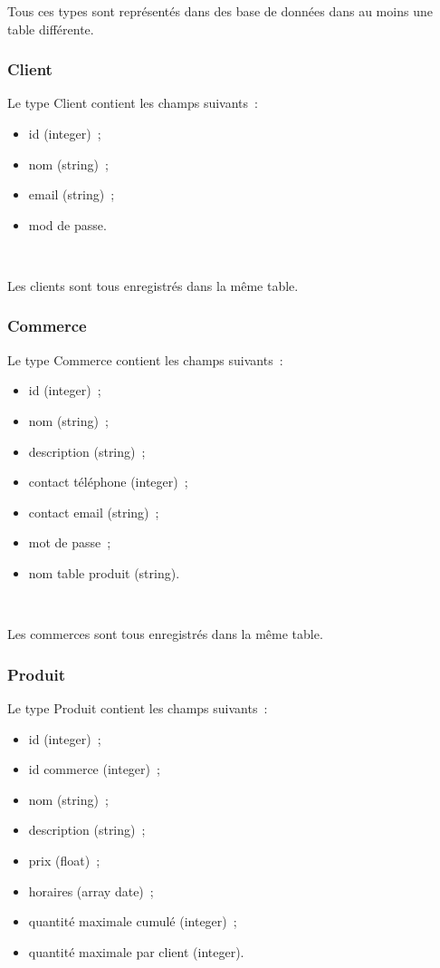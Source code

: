 \documentclass[a4paper,12pt]{article}
\begin{document}
Tous ces types sont représentés dans des base de données dans au moins une table différente.

\subsubsection{Client}

Le type Client contient les champs suivants~:
\begin{itemize}
	\item id (integer)~;
	\item nom (string)~;
	\item email (string)~;
	\item mod de passe.
\end{itemize} \

Les clients sont tous enregistrés dans la même table.

\subsubsection{Commerce}

Le type Commerce contient les champs suivants~:
\begin{itemize}
	\item id (integer)~;
	\item nom (string)~;
	\item description (string)~;
	\item contact téléphone (integer)~;
	\item contact email (string)~;
	\item mot de passe~;
	\item nom table produit (string).
\end{itemize} \

Les commerces sont tous enregistrés dans la même table.

\subsubsection{Produit}

Le type Produit contient les champs suivants~:
\begin{itemize}
	\item id (integer)~;
	\item id commerce (integer)~;
	\item nom (string)~;
	\item description (string)~;
	\item prix (float)~;
	\item horaires (array date)~;
	\item quantité maximale cumulé (integer)~;
	\item quantité maximale par client (integer).
\end{itemize} \
\end{document}
